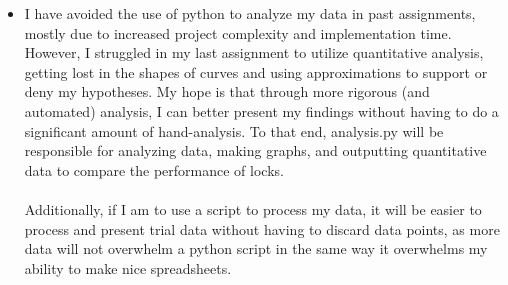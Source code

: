 \documentclass[]{article}
\begin{document}
\begin{itemize}
\begin{itemize}
		\item I have avoided the use of python to analyze my data in past assignments, mostly due to increased project complexity and implementation time. However, I struggled in my last assignment to utilize quantitative analysis, getting lost in the shapes of curves and using approximations to support or deny my hypotheses. My hope is that through more rigorous (and automated) analysis, I can better present my findings without having to do a significant amount of hand-analysis. To that end, analysis.py will be responsible for analyzing data, making graphs, and outputting quantitative data to compare the performance of locks.
		\\\\
		Additionally, if I am to use a script to process my data, it will be easier to process and present trial data without having to discard data points, as more data will not overwhelm a python script in the same way it overwhelms my ability to make nice spreadsheets.
	\end{itemize}
\end{itemize}
\end{document}
